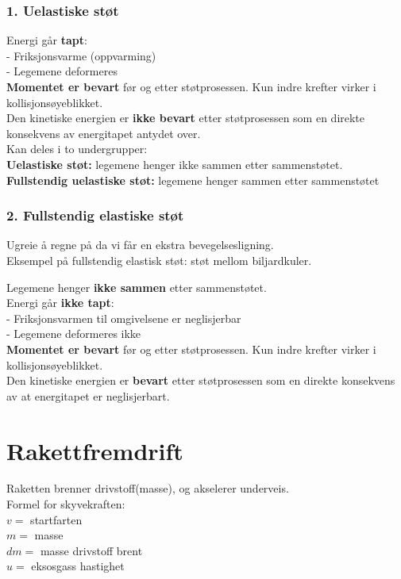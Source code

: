\documentclass[12pt]{article}
\begin{document}
\subsubsection{1. Uelastiske støt}
Energi går \textbf{tapt}:\\
- Friksjonsvarme (oppvarming)\\
- Legemene deformeres\\
\bigskip
\textbf{Momentet er bevart} før og etter støtprosessen. Kun indre krefter virker i kollisjonsøyeblikket.\\
\bigskip
Den kinetiske energien er \textbf{ikke bevart} etter støtprosessen som en direkte konsekvens av energitapet antydet over.\\
\bigskip
 Kan deles i to undergrupper: \\
 \textbf{Uelastiske støt:} legemene henger ikke sammen etter sammenstøtet.\\
 \textbf{Fullstendig uelastiske støt:} legemene henger sammen etter sammenstøtet\\
 \bigskip
\subsubsection{2. Fullstendig elastiske støt}
Ugreie å regne på da vi får en ekstra bevegelsesligning.\\
Eksempel på fullstendig elastisk støt: støt mellom biljardkuler.

Legemene henger \textbf{ikke sammen} etter sammenstøtet.\\
\bigskip
Energi går \textbf{ikke tapt}:\\
- Friksjonsvarmen til omgivelsene er neglisjerbar\\
- Legemene deformeres ikke\\
\bigskip
\textbf{Momentet er bevart} før og etter støtprosessen. Kun indre krefter virker i kollisjonsøyeblikket.\\
\bigskip
Den kinetiske energien er \textbf{bevart} etter støtprosessen som en direkte konsekvens av at energitapet er neglisjerbart.\\
\bigskip

\section{Rakettfremdrift}
Raketten brenner drivstoff(masse), og akselerer underveis.\\
\bigskip
Formel for skyvekraften:\\
$v =$ startfarten\\
$m =$ masse\\
$dm =$ masse drivstoff brent\\
$u =$ eksosgass hastighet\\
\end{document}
